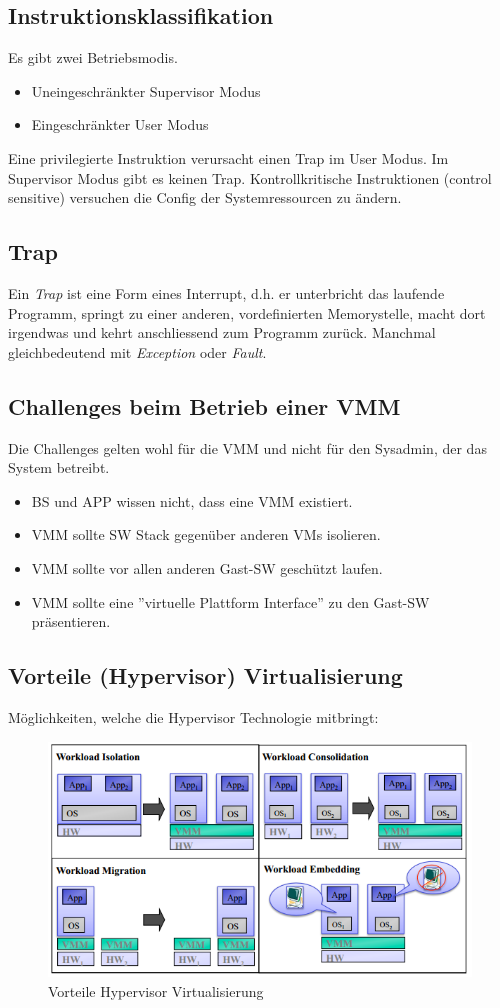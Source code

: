 \subsection{Instruktionsklassifikation}
Es gibt zwei Betriebsmodis.
\begin{itemize}
	\item Uneingeschränkter Supervisor Modus
	\item Eingeschränkter User Modus
\end{itemize}
Eine privilegierte Instruktion verursacht einen Trap im User Modus. Im Supervisor Modus gibt es keinen Trap. Kontrollkritische Instruktionen (control sensitive) versuchen die Config der Systemressourcen zu ändern.

\subsection{Trap}
Ein \textit{Trap} ist eine Form eines Interrupt, d.h. er unterbricht das laufende Programm, springt zu einer anderen, vordefinierten Memorystelle, macht dort irgendwas und kehrt anschliessend zum Programm zurück. Manchmal gleichbedeutend mit \textit{Exception} oder \textit{Fault}.

\subsection{Challenges beim Betrieb einer VMM}
Die Challenges gelten wohl für die VMM und nicht für den Sysadmin, der das System betreibt.
\begin{itemize}
	\item BS und APP wissen nicht, dass eine VMM existiert.
	\item VMM sollte SW Stack gegenüber anderen VMs isolieren.
	\item VMM sollte vor allen anderen Gast-SW geschützt laufen.
	\item VMM sollte eine ''virtuelle Plattform Interface'' zu den Gast-SW präsentieren.
\end{itemize}

\subsection{Vorteile (Hypervisor) Virtualisierung}
Möglichkeiten, welche die Hypervisor Technologie mitbringt:
\begin{figure}[h!]
	\centering
	\includegraphics[width=0.7\linewidth]{fig/vorteile-hypervisor-virtualisierung}
	\caption{Vorteile Hypervisor Virtualisierung}
	\label{fig:vorteile-hypervisor-virtualisierung}
\end{figure}

